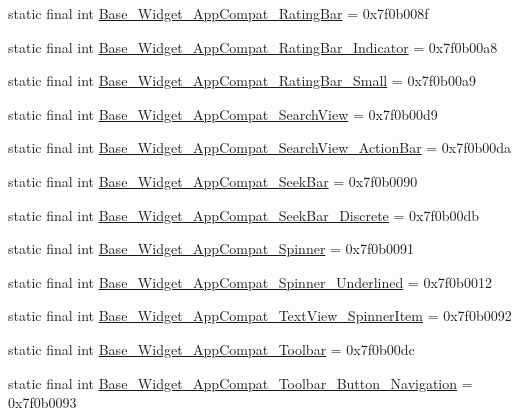\begin{CompactItemize}
\item 
static final int \hyperlink{classandroid_1_1support_1_1v7_1_1appcompat_1_1_r_1_1style_7dd96c12bf9176da4ee1ae3cc3655431}{Base\_\-Widget\_\-AppCompat\_\-RatingBar} = 0x7f0b008f
\item 
static final int \hyperlink{classandroid_1_1support_1_1v7_1_1appcompat_1_1_r_1_1style_0ca663a190ece468e7add57cf91039c3}{Base\_\-Widget\_\-AppCompat\_\-RatingBar\_\-Indicator} = 0x7f0b00a8
\item 
static final int \hyperlink{classandroid_1_1support_1_1v7_1_1appcompat_1_1_r_1_1style_1abbfe734e41d6ae9e7f8bf970c76c42}{Base\_\-Widget\_\-AppCompat\_\-RatingBar\_\-Small} = 0x7f0b00a9
\item 
static final int \hyperlink{classandroid_1_1support_1_1v7_1_1appcompat_1_1_r_1_1style_caa19b0d68f0dbc27c337871a0f0af3b}{Base\_\-Widget\_\-AppCompat\_\-SearchView} = 0x7f0b00d9
\item 
static final int \hyperlink{classandroid_1_1support_1_1v7_1_1appcompat_1_1_r_1_1style_f0891a573f5b1968c8ff1009ec0393b6}{Base\_\-Widget\_\-AppCompat\_\-SearchView\_\-ActionBar} = 0x7f0b00da
\item 
static final int \hyperlink{classandroid_1_1support_1_1v7_1_1appcompat_1_1_r_1_1style_1863410c98244f884e64f4a066aef7c8}{Base\_\-Widget\_\-AppCompat\_\-SeekBar} = 0x7f0b0090
\item 
static final int \hyperlink{classandroid_1_1support_1_1v7_1_1appcompat_1_1_r_1_1style_2c44961ecfef7c79dfce567a236f02e4}{Base\_\-Widget\_\-AppCompat\_\-SeekBar\_\-Discrete} = 0x7f0b00db
\item 
static final int \hyperlink{classandroid_1_1support_1_1v7_1_1appcompat_1_1_r_1_1style_7ccbb589e4feb4459df13d99a8d69714}{Base\_\-Widget\_\-AppCompat\_\-Spinner} = 0x7f0b0091
\item 
static final int \hyperlink{classandroid_1_1support_1_1v7_1_1appcompat_1_1_r_1_1style_f4d8bd3c23cf30e366b68e26e1504e2c}{Base\_\-Widget\_\-AppCompat\_\-Spinner\_\-Underlined} = 0x7f0b0012
\item 
static final int \hyperlink{classandroid_1_1support_1_1v7_1_1appcompat_1_1_r_1_1style_50b56967b28564f35723b7df82b4ba82}{Base\_\-Widget\_\-AppCompat\_\-TextView\_\-SpinnerItem} = 0x7f0b0092
\item 
static final int \hyperlink{classandroid_1_1support_1_1v7_1_1appcompat_1_1_r_1_1style_b1a8fd3a063aed4668be12409ea77ab5}{Base\_\-Widget\_\-AppCompat\_\-Toolbar} = 0x7f0b00dc
\item 
static final int \hyperlink{classandroid_1_1support_1_1v7_1_1appcompat_1_1_r_1_1style_721342a7d5505366881804cea711568b}{Base\_\-Widget\_\-AppCompat\_\-Toolbar\_\-Button\_\-Navigation} = 0x7f0b0093

\end{CompactItemize}

